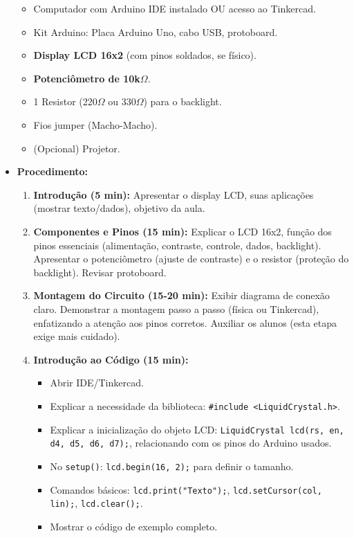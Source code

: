 \documentclass[a4paper,12pt]{article}
\begin{document}
\begin{itemize}
    \begin{itemize}
        \item Computador com Arduino IDE instalado OU acesso ao Tinkercad.
        \item Kit Arduino: Placa Arduino Uno, cabo USB, protoboard.
        \item \textbf{Display LCD 16x2} (com pinos soldados, se físico).
        \item \textbf{Potenciômetro de 10k$\Omega$}.
        \item 1 Resistor (220$\Omega$ ou 330$\Omega$) para o backlight.
        \item Fios jumper (Macho-Macho).
        \item (Opcional) Projetor.
    \end{itemize}
    \item \textbf{Procedimento:}
    \begin{enumerate}
        \item \textbf{Introdução (5 min):} Apresentar o display LCD, suas aplicações (mostrar texto/dados), objetivo da aula.
        \item \textbf{Componentes e Pinos (15 min):} Explicar o LCD 16x2, função dos pinos essenciais (alimentação, contraste, controle, dados, backlight). Apresentar o potenciômetro (ajuste de contraste) e o resistor (proteção do backlight). Revisar protoboard.
        \item \textbf{Montagem do Circuito (15-20 min):} Exibir diagrama de conexão claro. Demonstrar a montagem passo a passo (física ou Tinkercad), enfatizando a atenção aos pinos corretos. Auxiliar os alunos (esta etapa exige mais cuidado).
        \item \textbf{Introdução ao Código (15 min):}
            \begin{itemize}
                \item Abrir IDE/Tinkercad.
                \item Explicar a necessidade da biblioteca: \texttt{#include <LiquidCrystal.h>}.
                \item Explicar a inicialização do objeto LCD: \texttt{LiquidCrystal lcd(rs, en, d4, d5, d6, d7);}, relacionando com os pinos do Arduino usados.
                \item No \texttt{setup()}: \texttt{lcd.begin(16, 2);} para definir o tamanho.
                \item Comandos básicos: \texttt{lcd.print("Texto");}, \texttt{lcd.setCursor(col, lin);}, \texttt{lcd.clear();}.
                \item Mostrar o código de exemplo completo.

\end{itemize}
\end{enumerate}
\end{itemize}
\end{document}
